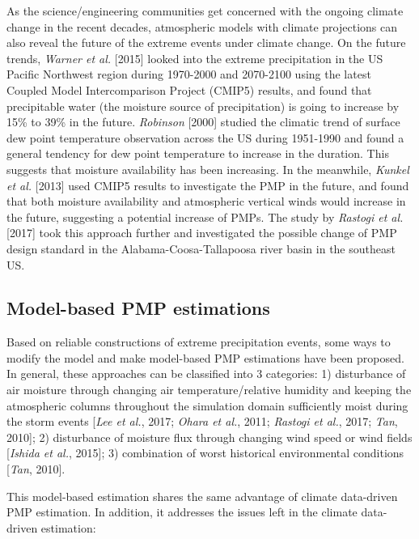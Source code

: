 As the science/engineering communities get concerned with the ongoing climate change in the recent decades, atmospheric models with climate projections can also reveal the future of the extreme events under climate change. On the future trends, \textit{Warner et al.} [2015] looked into the extreme precipitation in the US Pacific Northwest region during 1970-2000 and 2070-2100 using the latest Coupled Model Intercomparison Project (CMIP5) results, and found that precipitable water (the moisture source of precipitation) is going to increase by 15\% to 39\% in the future. \textit{Robinson} [2000] studied the climatic trend of surface dew point temperature observation across the US during 1951-1990 and found a general tendency for dew point temperature to increase in the duration. This suggests that moisture availability has been increasing. In the meanwhile, \textit{Kunkel et al.} [2013] used CMIP5 results to investigate the PMP in the future, and found that both moisture availability and atmospheric vertical winds would increase in the future, suggesting a potential increase of PMPs. The study by \textit{Rastogi et al.} [2017]  took this approach further and investigated the possible change of PMP design standard in the Alabama-Coosa-Tallapoosa river basin in the southeast US.

\subsection{Model-based PMP estimations}

Based on reliable constructions of extreme precipitation events, some ways to modify the model and make model-based PMP estimations have been proposed. In general, these approaches can be classified into 3 categories: 1) disturbance of air moisture through changing air temperature/relative humidity and keeping the atmospheric columns throughout the simulation domain sufficiently moist during the storm events [\textit{Lee et al.}, 2017; \textit{Ohara et al.}, 2011; \textit{Rastogi et al.}, 2017; \textit{Tan}, 2010]; 2) disturbance of moisture flux through changing wind speed or wind fields [\textit{Ishida et al.}, 2015]; 3) combination of worst historical environmental conditions [\textit{Tan}, 2010].

This model-based estimation shares the same advantage of climate data-driven PMP estimation. In addition, it addresses the issues left in the climate data-driven estimation:

